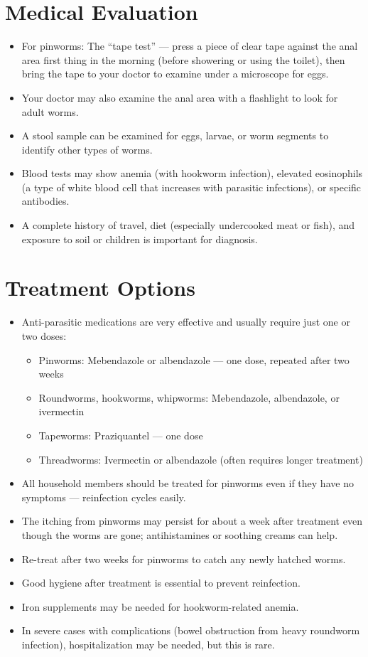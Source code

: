 \section*{Medical Evaluation}
\begin{itemize}
  \item For pinworms: The ``tape test'' — press a piece of clear tape against the anal area first thing in the morning (before showering or using the toilet), then bring the tape to your doctor to examine under a microscope for eggs.
  \item Your doctor may also examine the anal area with a flashlight to look for adult worms.
  \item A stool sample can be examined for eggs, larvae, or worm segments to identify other types of worms.
  \item Blood tests may show anemia (with hookworm infection), elevated eosinophils (a type of white blood cell that increases with parasitic infections), or specific antibodies.
  \item A complete history of travel, diet (especially undercooked meat or fish), and exposure to soil or children is important for diagnosis.
\end{itemize}

\section*{Treatment Options}
\begin{itemize}
  \item Anti-parasitic medications are very effective and usually require just one or two doses:
    \begin{itemize}
      \item Pinworms: Mebendazole or albendazole — one dose, repeated after two weeks
      \item Roundworms, hookworms, whipworms: Mebendazole, albendazole, or ivermectin
      \item Tapeworms: Praziquantel — one dose
      \item Threadworms: Ivermectin or albendazole (often requires longer treatment)
    \end{itemize}
  \item All household members should be treated for pinworms even if they have no symptoms — reinfection cycles easily.
  \item The itching from pinworms may persist for about a week after treatment even though the worms are gone; antihistamines or soothing creams can help.
  \item Re-treat after two weeks for pinworms to catch any newly hatched worms.
  \item Good hygiene after treatment is essential to prevent reinfection.
  \item Iron supplements may be needed for hookworm-related anemia.
  \item In severe cases with complications (bowel obstruction from heavy roundworm infection), hospitalization may be needed, but this is rare.
\end{itemize}

